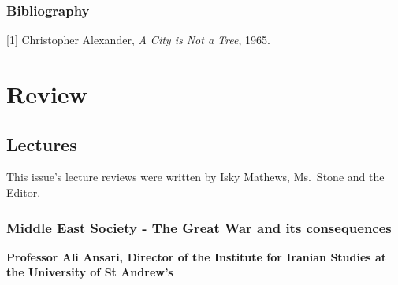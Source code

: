 \documentclass[11pt,a4paper]{report}
\begin{document}
\begin{adjustwidth}{5cm}{5cm}
\subsection{Bibliography}
	[1] 
	Christopher Alexander,
	\textit{A City is Not a Tree},
	1965.

\end{adjustwidth}

\chapter{Review}\label{review}

\section{Lectures}\label{lectures}

This issue's lecture reviews were written by Isky Mathews, Ms.~Stone and
the Editor.

\subsection{Middle East Society - The Great War and its consequences}

\textbf{Professor Ali Ansari, Director of the Institute for Iranian Studies at
the University of St Andrew's}
\end{document}
